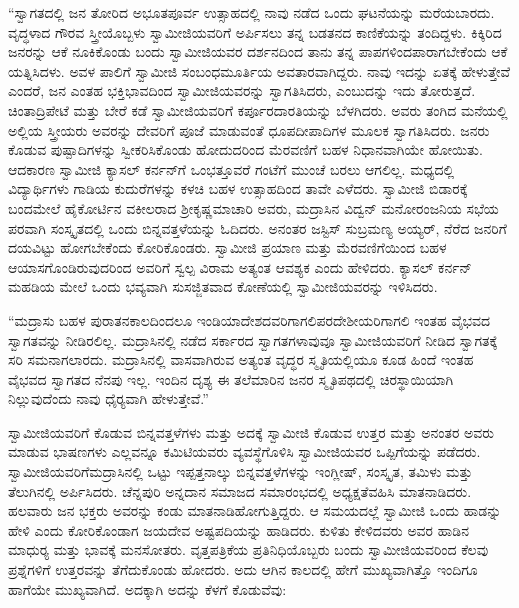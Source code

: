 \vskip 2pt

 “ಸ್ವಾಗತದಲ್ಲಿ ಜನ ತೋರಿದ ಅಭೂತಪೂರ್ವ ಉತ್ಸಾಹದಲ್ಲಿ ನಾವು ನಡೆದ ಒಂದು ಘಟನೆಯನ್ನು ಮರೆಯಬಾರದು. ವೃದ್ಧಳಾದ ಗೌರವ ಸ್ತ್ರೀಯೊಬ್ಬಳು ಸ್ವಾಮೀಜಿಯವರಿಗೆ ಅರ್ಪಿಸಲು ತನ್ನ ಬಡತನದ ಕಾಣಿಕೆಯನ್ನು ತಂದಿದ್ದಳು. ಕಿಕ್ಕಿರಿದ ಜನರನ್ನು ಆಕೆ ನೂಕಿಕೊಂಡು ಬಂದು ಸ್ವಾಮೀಜಿಯವರ ದರ್ಶನದಿಂದ ತಾನು ತನ್ನ ಪಾಪಗಳಿಂದ\break ಪಾರಾಗಬೇಕೆಂದು ಆಕೆ ಯತ್ನಿಸಿದಳು. ಅವಳ ಪಾಲಿಗೆ ಸ್ವಾಮೀಜಿ ಸಂಬಂಧಮೂರ್ತಿಯ ಅವತಾರವಾಗಿದ್ದರು. ನಾವು ಇದನ್ನು ಏತಕ್ಕೆ ಹೇಳುತ್ತೇವೆ ಎಂದರೆ, ಜನ ಎಂತಹ ಭಕ್ತಿಭಾವದಿಂದ ಸ್ವಾಮೀಜಿಯವರನ್ನು ಸ್ವಾಗತಿಸಿದರು, ಎಂಬುದನ್ನು ಇದು ತೋರುತ್ತದೆ. ಚಿಂತಾದ್ರಿಪೇಟೆ ಮತ್ತು ಬೇರೆ ಕಡೆ ಸ್ವಾಮೀಜಿಯವರಿಗೆ ಕರ್ಪೂರದಾರತಿಯನ್ನು ಬೆಳಗಿದರು. ಅವರು ತಂಗಿದ ಮನೆಯಲ್ಲಿ ಅಲ್ಲಿಯ ಸ್ತ್ರೀಯರು ಅವರನ್ನು ದೇವರಿಗೆ ಪೂಜೆ ಮಾಡುವಂತೆ ಧೂಪದೀಪಾದಿಗಳ ಮೂಲಕ ಸ್ವಾಗತಿಸಿದರು. ಜನರು ಕೊಡುವ ಪುಷ್ಪಾದಿಗಳನ್ನು ಸ್ವೀಕರಿಸಿಕೊಂಡು ಹೋದುದರಿಂದ ಮೆರವಣಿಗೆ ಬಹಳ ನಿಧಾನವಾಗಿಯೇ ಹೋಯಿತು. ಆದಕಾರಣ ಸ್ವಾಮೀಜಿ ಕ್ಯಾಸಲ್ ಕರ್ನನ್‍ಗೆ ಒಂಭತ್ತೂವರೆ ಗಂಟೆಗೆ ಮುಂಚೆ ಬರಲು ಆಗಲಿಲ್ಲ. ಮಧ್ಯದಲ್ಲಿ ವಿದ್ಯಾರ್ಥಿಗಳು ಗಾಡಿಯ ಕುದುರೆಗಳನ್ನು ಕಳಚಿ ಬಹಳ ಉತ್ಸಾಹದಿಂದ ತಾವೇ ಎಳೆದರು. ಸ್ವಾಮೀಜಿ ಬಿಡಾರಕ್ಕೆ ಬಂದಮೇಲೆ ಹೈಕೋರ್ಟಿನ ವಕೀಲರಾದ ಶ‍್ರೀಕೃಷ್ಣಮಾಚಾರಿ ಅವರು, ಮದ್ರಾಸಿನ ವಿದ್ವನ್ ಮನೋರಂಜನಿಯ ಸಭೆಯ ಪರವಾಗಿ ಸಂಸ್ಕೃತದಲ್ಲಿ ಒಂದು ಬಿನ್ನವತ್ತಳೆಯನ್ನು ಓದಿದರು. ಅನಂತರ ಜಸ್ಟಿಸ್ ಸುಬ್ರಮಣ್ಯ ಅಯ್ಯರ್, ನೆರೆದ ಜನರಿಗೆ ದಯವಿಟ್ಟು ಹೋಗಬೇಕೆಂದು ಕೋರಿಕೊಂಡರು. ಸ್ವಾಮೀಜಿ ಪ್ರಯಾಣ ಮತ್ತು ಮೆರವಣಿಗೆಯಿಂದ ಬಹಳ ಆಯಾಸಗೊಂಡಿರುವುದರಿಂದ ಅವರಿಗೆ ಸ್ವಲ್ಪ ವಿರಾಮ ಅತ್ಯಂತ ಆವಶ್ಯಕ ಎಂದು ಹೇಳಿದರು. ಕ್ಯಾಸಲ್ ಕರ್ನನ್ ಮಹಡಿಯ ಮೇಲೆ ಒಂದು ಭವ್ಯವಾಗಿ ಸುಸಜ್ಜಿತವಾದ ಕೋಣೆಯಲ್ಲಿ ಸ್ವಾಮೀಜಿಯವರನ್ನು ಇಳಿಸಿದರು. 

\vskip 2pt

 “ಮದ್ರಾಸು ಬಹಳ ಪುರಾತನಕಾಲದಿಂದಲೂ ಇಂಡಿಯಾದೇಶದವರಿಗಾಗಲಿ\break ಪರದೇಶೀಯರಿಗಾಗಲಿ ಇಂತಹ ವೈಭವದ ಸ್ವಾಗತವನ್ನು ನೀಡಿರಲಿಲ್ಲ. ಮದ್ರಾಸಿನಲ್ಲಿ ನಡೆದ ಸರ್ಕಾರದ ಸ್ವಾಗತಗಳಾವುವೂ ಸ್ವಾಮೀಜಿಯವರಿಗೆ ನೀಡಿದ ಸ್ವಾಗತಕ್ಕೆ ಸರಿ ಸಮನಾಗಲಾರದು. ಮದ್ರಾಸಿನಲ್ಲಿ ವಾಸವಾಗಿರುವ ಅತ್ಯಂತ ವೃದ್ಧರ ಸ್ಮೃತಿಯಲ್ಲಿಯೂ ಕೂಡ ಹಿಂದೆ ಇಂತಹ ವೈಭವದ ಸ್ವಾಗತದ ನೆನಪು ಇಲ್ಲ. ಇಂದಿನ ದೃಶ್ಯ ಈ ತಲೆಮಾರಿನ ಜನರ ಸ್ಮೃತಿಪಥದಲ್ಲಿ ಚಿರಸ್ಥಾಯಿಯಾಗಿ ನಿಲ್ಲುವುದೆಂದು ನಾವು ಧೈರ‍್ಯವಾಗಿ ಹೇಳುತ್ತೇವೆ.” 

 ಸ್ವಾಮೀಜಿಯವರಿಗೆ ಕೊಡುವ ಬಿನ್ನವತ್ತಳೆಗಳು ಮತ್ತು ಅದಕ್ಕೆ ಸ್ವಾಮೀಜಿ ಕೊಡುವ ಉತ್ತರ ಮತ್ತು ಅನಂತರ ಅವರು ಮಾಡುವ ಭಾಷಣಗಳು ಎಲ್ಲವನ್ನೂ ಕಮಿಟಿಯವರು ವ್ಯವಸ್ಥೆಗೊಳಿಸಿ ಸ್ವಾಮೀಜಿಯವರ ಒಪ್ಪಿಗೆಯನ್ನು ಪಡೆದರು. ಸ್ವಾಮೀಜಿಯವರಿಗೆ\break ಮದ್ರಾಸಿನಲ್ಲಿ ಒಟ್ಟು ಇಪ್ಪತ್ತನಾಲ್ಕು ಬಿನ್ನವತ್ತಳೆಗಳನ್ನು ಇಂಗ್ಲೀಷ್, ಸಂಸ್ಕೃತ, ತಮಿಳು ಮತ್ತು ತೆಲುಗಿನಲ್ಲಿ ಅರ್ಪಿಸಿದರು. ಚೆನ್ನಪುರಿ ಅನ್ನದಾನ ಸಮಾಜದ ಸಮಾರಂಭದಲ್ಲಿ ಅಧ್ಯಕ್ಷತೆವಹಿಸಿ ಮಾತನಾಡಿದರು. ಹಲವಾರು ಜನ ಭಕ್ತರು ಅವರನ್ನು ಕಂಡು ಮಾತನಾಡಿಹೋಗುತ್ತಿದ್ದರು. ಆ ಸಮಯದಲ್ಲೆ ಸ್ವಾಮೀಜಿ ಒಂದು ಹಾಡನ್ನು ಹೇಳಿ ಎಂದು ಕೋರಿಕೊಂಡಾಗ ಜಯದೇವ ಅಷ್ಟಪದಿಯನ್ನು ಹಾಡಿದರು. ಕುಳಿತು ಕೇಳಿದವರು ಅವರ ಹಾಡಿನ ಮಾಧುರ‍್ಯ ಮತ್ತು ಭಾವಕ್ಕೆ ಮನಸೋತರು. ವೃತ್ತಪತ್ರಿಕೆಯ ಪ್ರತಿನಿಧಿಯೊಬ್ಬರು ಬಂದು ಸ್ವಾಮೀಜಿಯವರಿಂದ ಕೆಲವು ಪ್ರಶ್ನೆಗಳಿಗೆ ಉತ್ತರವನ್ನು ತೆಗೆದುಕೊಂಡು ಹೋದರು. ಅದು ಆಗಿನ ಕಾಲದಲ್ಲಿ ಹೇಗೆ ಮುಖ್ಯವಾಗಿತ್ತೊ ಇಂದಿಗೂ ಹಾಗೆಯೇ ಮುಖ್ಯವಾಗಿದೆ. ಅದಕ್ಕಾಗಿ ಅದನ್ನು ಕೆಳಗೆ ಕೊಡುವೆವು: 

